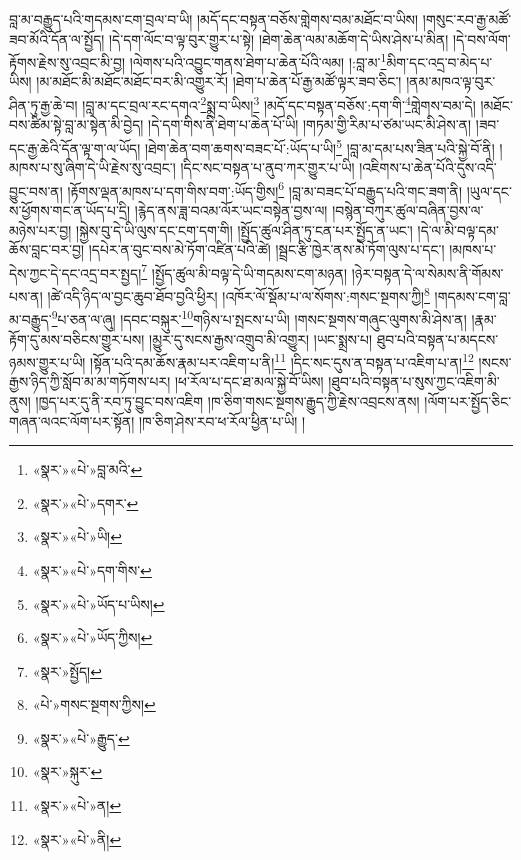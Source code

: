 བླ་མ་བརྒྱུད་པའི་གདམས་ངག་བྲལ་བ་ཡི། །མདོ་དང་བསྟན་བཅོས་གླེགས་བམ་མཐོང་བ་ཡིས། །གསུང་རབ་རྒྱ་མཚོ་ཟབ་མོའི་དོན་ལ་སྤྱོད། །དེ་དག་ལོང་བ་ལྟ་བུར་གྱུར་པ་སྟེ། །ཐེག་ཆེན་ལམ་མཆོག་དེ་ཡིས་ཤེས་པ་མིན། །དེ་བས་ལོག་རྟོགས་རྗེས་སུ་འབྲང་མི་བྱ། །ལེགས་པའི་འབྱུང་གནས་ཐེག་པ་ཆེན་པོའི་ལམ། །:བླ་མ་\footnote{«སྣར་»«པེ་»བླ་མའི་}མིག་དང་འདྲ་བ་མེད་པ་ཡིས། །མ་མཐོང་མི་མཐོང་མཐོང་བར་མི་འགྱུར་རོ། །ཐེག་པ་ཆེན་པོ་རྒྱ་མཚོ་ལྟར་ཟབ་ཅིང་། །ནམ་མཁའ་ལྟ་བུར་ཤིན་ཏུ་རྒྱ་ཆེ་བ། །བླ་མ་དང་བྲལ་རང་དགའ་\footnote{«སྣར་»«པེ་»དགར་}སྨྲ་བ་ཡིས།\footnote{«སྣར་»«པེ་»ཡི།} །མདོ་དང་བསྟན་བཅོས་:དག་གི་\footnote{«སྣར་»«པེ་»དག་གིས་}གླེགས་བམ་དེ། །མཐོང་བས་ཚིམ་སྟེ་བླ་མ་སྟེན་མི་བྱེད། །དེ་དག་གིས་ནི་ཐེག་པ་ཆེན་པོ་ཡི། །གཏམ་གྱི་རིམ་པ་ཙམ་ཡང་མི་ཤེས་ན། །ཟབ་དང་རྒྱ་ཆེའི་དོན་ལྟ་ག་ལ་ཡོད། །ཐེག་ཆེན་བག་ཆགས་བཟང་པོ་:ཡོད་པ་ཡི།\footnote{«སྣར་»«པེ་»ཡོད་པ་ཡིས།} །བླ་མ་དམ་པས་ཟིན་པའི་སྐྱེ་བོ་ནི། །མཁས་པ་སུ་ཞིག་དེ་ཡི་རྗེས་སུ་འབྲང་། །དིང་སང་བསྟན་པ་ནུབ་ཀར་གྱུར་པ་ཡི། །འཇིགས་པ་ཆེན་པོའི་དུས་འདི་བྱུང་བས་ན། །རྟོགས་ལྡན་མཁས་པ་དག་གིས་བག་:ཡོད་གྱིས།\footnote{«སྣར་»«པེ་»ཡོད་ཀྱིས།} །བླ་མ་བཟང་པོ་བརྒྱུད་པའི་གང་ཟག་ནི། །ཡུལ་དང་ས་ཕྱོགས་གང་ན་ཡོད་པ་དྲི། །རྙེད་ནས་ཟླ་བའམ་ལོར་ཡང་བསྟེན་བྱས་ལ། །བསྙེན་བཀུར་ཚུལ་བཞིན་བྱས་ལ་མཉེས་པར་བྱ། །སྐྱེས་བུ་དེ་ཡི་ལུས་དང་ངག་དག་གི། །སྤྱོད་ཚུལ་ཤིན་ཏུ་ངན་པར་སྤྱོད་ན་ཡང་། །དེ་ལ་མི་བལྟ་དམ་ཆོས་བླང་བར་བྱ། །དཔེར་ན་བུང་བས་མེ་ཏོག་འཛིན་པའི་ཚེ། །སྦྲང་རྩི་ཁྱེར་ནས་མེ་ཏོག་ལུས་པ་དང་། །མཁས་པ་དེས་ཀྱང་དེ་དང་འདྲ་བར་སྤྱད།\footnote{«སྣར་»སྤྱོད།} །སྤྱོད་ཚུལ་མི་བལྟ་དེ་ཡི་གདམས་ངག་མཉན། །ཉེར་བསྟན་དེ་ལ་སེམས་ནི་གོམས་པས་ན། །ཚེ་འདི་ཉིད་ལ་བྱང་ཆུབ་ཐོབ་བྱའི་ཕྱིར། །འཁོར་ལོ་སྡོམ་པ་ལ་སོགས་:གསང་སྔགས་ཀྱི།\footnote{«པེ་»གསང་སྔགས་ཀྱིས།} །གདམས་ངག་བླ་མ་བརྒྱུད་\footnote{«སྣར་»«པེ་»རྒྱུད་}པ་ཅན་ལ་ཞུ། །དབང་བསྐུར་\footnote{«སྣར་»སྐུར་}གཉིས་པ་སྤངས་པ་ཡི། །གསང་སྔགས་གཞུང་ལུགས་མི་ཤེས་ན། །རྣམ་རྟོག་དུ་མས་བཅིངས་གྱུར་པས། །མྱུར་དུ་སངས་རྒྱས་འགྲུབ་མི་འགྱུར། །ཡང་སྨྲས་པ། ཐུབ་པའི་བསྟན་པ་མདངས་ཉམས་གྱུར་པ་ཡི། །སྟོན་པའི་དམ་ཆོས་རྣམ་པར་འཇིག་པ་ནི།\footnote{«སྣར་»«པེ་»ན།} །དིང་སང་དུས་ན་བསྟན་པ་འཇིག་པ་ན།\footnote{«སྣར་»«པེ་»ནི།} །སངས་རྒྱས་ཉིད་ཀྱི་སློབ་མ་མ་གཏོགས་པར། །ཕ་རོལ་པ་དང་ཐ་མལ་སྐྱེ་བོ་ཡིས། །ཐུབ་པའི་བསྟན་པ་སུས་ཀྱང་འཇིག་མི་ནུས། །ཁྱད་པར་དུ་ནི་རབ་ཏུ་བྱུང་བས་འཇིག །ཁ་ཅིག་གསང་སྔགས་རྒྱུད་ཀྱི་རྗེས་འབྲངས་ནས། །ལོག་པར་སྤྱོད་ཅིང་གཞན་ལའང་ལོག་པར་སྟོན། །ཁ་ཅིག་ཤེས་རབ་ཕ་རོལ་ཕྱིན་པ་ཡི། །
